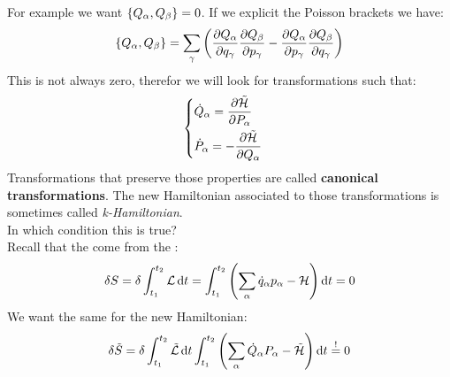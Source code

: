 For example we want $\pb{Q_{\alpha}}{Q_{\beta}} = 0$. If we explicit the Poisson brackets we have:
\begin{equation}
    \pb{Q_{\alpha}}{Q_{\beta}} = \bigsum_{\gamma} \left(\pdv{Q_{\alpha}}{q_{\gamma}} \pdv{Q_{\beta}}{p_{\gamma}} - \pdv{Q_{\alpha}}{p_{\gamma}} \pdv{Q_{\beta}}{q_{\gamma}} \right)
\end{equation}
This is not always zero, therefor we will look for transformations such that:
\begin{equation}
    \begin{cases}
        \dot{Q}_{\alpha} = \pdv{\tilde{\hamfun}}{P_{\alpha}} \\[8pt]
        \dot{P}_{\alpha} = -\pdv{\tilde{\hamfun}}{Q_{\alpha}}
    \end{cases}
\end{equation}
Transformations that preserve those properties are called \textbf{canonical transformations}. The new Hamiltonian associated to those transformations is sometimes called \textit{k-Hamiltonian}.\\
In which condition this is true?\\
Recall that the \hamiltonref\;come from the \hpquotemath :
\begin{equation}
    \delta S = \delta \int_{t_1}^{t_2}\mathcal{L} \dd{t} = \int_{t_1}^{t_2} \left(\displaystyle\sum_{\alpha}\dot{q}_{\alpha}p_{\alpha} - \mathcal{H}\right) \dd{t} =0
\end{equation}
We want the same for the new Hamiltonian:
\begin{equation}
    \delta \tilde{S} = \delta \int_{t_1}^{t_2}\tilde{\mathcal{L}} \dd{t} \int_{t_1}^{t_2} \left(\displaystyle\sum_{\alpha}\dot{Q}_{\alpha}P_{\alpha} - \tilde{\mathcal{H}}\right) \dd{t} \overset{!}{=} 0
\end{equation}
